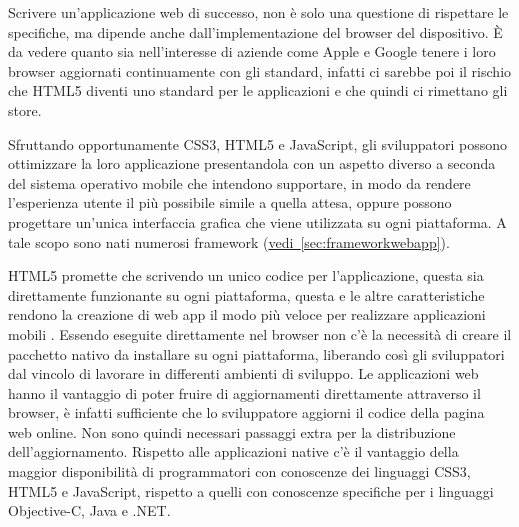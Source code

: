 		Scrivere un'applicazione web di successo, non è solo una questione di
		rispettare le specifiche, ma dipende anche dall'implementazione del 
		browser del dispositivo. È da vedere quanto sia nell'interesse di 
		aziende come Apple e Google tenere i loro browser aggiornati 
		continuamente con gli standard, infatti ci sarebbe poi il rischio che 
		HTML5 diventi uno standard per le applicazioni e che quindi ci rimettano 
		gli store\citep{White:Native-vs-Html}. 

		Sfruttando opportunamente CSS3, HTML5 e JavaScript, gli sviluppatori 
		possono ottimizzare la loro applicazione presentandola con un aspetto 
		diverso a seconda del sistema operativo mobile che intendono supportare, 
		in modo da rendere l'esperienza utente il più possibile simile a quella 
		attesa, oppure possono progettare un'unica interfaccia grafica che viene 
		utilizzata su ogni piattaforma. A tale scopo sono nati numerosi 
		framework (\hyperref[sec:frameworkwebapp]{vedi~\ref{sec:frameworkwebapp}}).

		HTML5 promette che scrivendo un unico codice per l'applicazione, 
		questa sia direttamente funzionante su ogni piattaforma, questa e le 
		altre caratteristiche rendono la creazione di web app il modo più veloce 
		per realizzare applicazioni mobili  \crossplat. Essendo eseguite 
		direttamente nel browser non c'è la necessità di creare il pacchetto 
		nativo da installare su ogni piattaforma, liberando così gli 
		sviluppatori dal vincolo di lavorare in differenti ambienti di sviluppo. 
		Le applicazioni web hanno il vantaggio di poter fruire di aggiornamenti 
		direttamente attraverso il browser, è infatti sufficiente che lo 
		sviluppatore aggiorni il codice della pagina web online. Non sono quindi
		necessari passaggi extra per la distribuzione dell'aggiornamento. 
		Rispetto alle applicazioni native c'è il vantaggio della maggior 
		disponibilità di programmatori con conoscenze dei linguaggi CSS3, HTML5 
		e JavaScript, rispetto a quelli con conoscenze specifiche per i 
		linguaggi Objective-C, Java e .NET.

